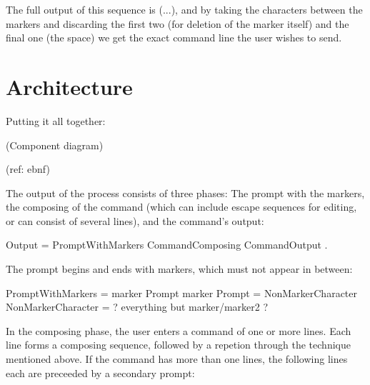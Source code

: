 \documentclass[paper=a4,twoside,abstract=on,cleardoublepage=empty,numbers=noenddot,toc=bib,11pt,appendixprefix=true]{scrreprt}
\begin{document}
The full output of this sequence is (...), and by taking the characters between the markers and discarding the first two (for deletion of the marker itself) and the final one (the space) we get the exact command line the user wishes to send.

%
%

\section{Architecture}

Putting it all together:

(Component diagram)

(ref: ebnf)


The output of the process consists of three phases: The prompt with the markers, the composing of the command (which can include escape sequences for editing, or can consist of several lines), and the command's output:

\begin{ebnf}
Output = { PromptWithMarkers CommandComposing CommandOutput } .
\end{ebnf}
%
The prompt begins and ends with markers, which must not appear in between:

\begin{ebnf}
PromptWithMarkers = marker Prompt marker
Prompt = { NonMarkerCharacter }
NonMarkerCharacter = ? everything but marker/marker2 ?
\end{ebnf}
%
In the composing phase, the user enters a command of one or more lines. Each line forms a composing sequence, followed by a repetion through the technique mentioned above. If the command has more than one lines, the following lines each are preceeded by a secondary prompt:
\end{document}

